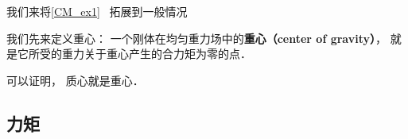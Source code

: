 
\begin{issues}
\issueDraft
\end{issues}


我们来将\autoref{CM_ex1}~ 拓展到一般情况

我们先来定义重心： 一个刚体在均匀重力场中的\textbf{重心（center of gravity）}， 就是它所受的重力关于重心产生的合力矩为零的点．

可以证明， 质心就是重心．

\subsection{力矩}
